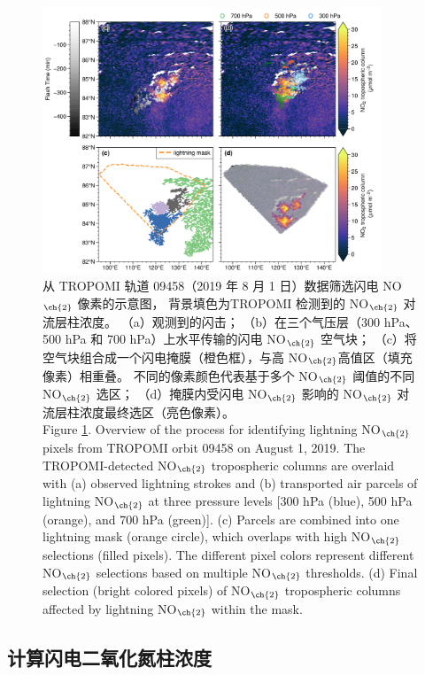 \begin{figure}[H]
\centering
\includegraphics[width=0.9\textwidth]{./figures/arctic_workflow.png}
\caption{
从 TROPOMI 轨道 09458（2019 年 8 月 1 日）数据筛选闪电 NO$_{\ch{2}}$ 像素的示意图，
背景填色为TROPOMI 检测到的 NO$_{\ch{2}}$ 对流层柱浓度。
（a）观测到的闪击；
（b）在三个气压层（300 hPa、500 hPa 和 700 hPa）上水平传输的闪电 NO$_{\ch{2}}$ 空气块；
（c）将空气块组合成一个闪电掩膜（橙色框），与高 NO$_{\ch{2}}$高值区（填充像素）相重叠。
不同的像素颜色代表基于多个 NO$_{\ch{2}}$ 阈值的不同 NO$_{\ch{2}}$ 选区；
（d）掩膜内受闪电 NO$_{\ch{2}}$ 影响的 NO$_{\ch{2}}$ 对流层柱浓度最终选区（亮色像素）。\\
Figure \ref{fig:workflow}. Overview of the process for identifying lightning NO$_{\ch{2}}$ pixels from TROPOMI orbit 09458 on August 1, 2019.
The TROPOMI-detected NO$_{\ch{2}}$ tropospheric columns are overlaid with (a) observed lightning strokes and
(b) transported air parcels of lightning NO$_{\ch{2}}$ at three pressure levels [300 hPa (blue), 500 hPa (orange), and 700 hPa (green)].
(c) Parcels are combined into one lightning mask (orange circle), which overlaps with high NO$_{\ch{2}}$ selections (filled pixels). The different pixel colors represent different NO$_{\ch{2}}$ selections based on multiple NO$_{\ch{2}}$ thresholds.
(d) Final selection (bright colored pixels) of NO$_{\ch{2}}$ tropospheric columns affected by lightning NO$_{\ch{2}}$ within the mask.
}
\label{fig:workflow}
\end{figure}


\subsection*{计算闪电二氧化氮柱浓度}

